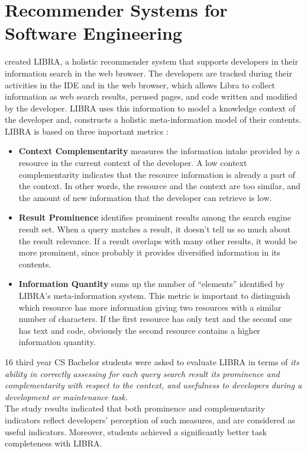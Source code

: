 \documentclass[12pt,mscthesis]{usiinfthesis}
\begin{document}
	\section{Recommender Systems for Software Engineering}
	\citet{Ponz2017a} created LIBRA, a holistic recommender system that supports developers in their information search in the web browser. The developers are tracked during their activities in the IDE and in the web browser, which allows Libra to collect information as web search results, perused pages, and code written and modified by the developer. LIBRA uses this information to model a knowledge context of the developer and, constructs a holistic meta-information model of their contents.\\
	
	LIBRA is based on three important metrics :
	
	\begin{itemize}
	\item \textbf{Context Complementarity} measures the information intake provided by a resource in the current context of the developer. A low context complementarity indicates that the resource information is already a part of the context. In other words, the resource and the context are too similar, and the amount of new information that the developer can retrieve is low.
	
	\item \textbf{Result Prominence} identifies prominent results among the search engine result set. When a query matches a result, it doesn't tell us so much about the result relevance. If a result overlaps with many other results, it would be more prominent, since probably it provides diversified information in its contents.
	
	\item \textbf{Information Quantity} sums up the number of ``elements'' identified by LIBRA's meta-information system. This metric is important to distinguish which resource has more information giving two resources with a similar number of characters. If the first resource has only text and the second one has text and code, obviously the second resource contains a higher information quantity.
	\end{itemize}
	16 third year CS Bachelor students were asked to evaluate LIBRA in terms of \textit{its ability in correctly assessing for each query search result its prominence and complementarity with respect to the context, and usefulness to developers during a development or maintenance task.}\\
	The study results indicated that both prominence and complementarity indicators reflect developers’ perception of such measures, and are considered as useful indicators. Moreover, students  achieved a significantly better task completeness with LIBRA.\\
\end{document}
